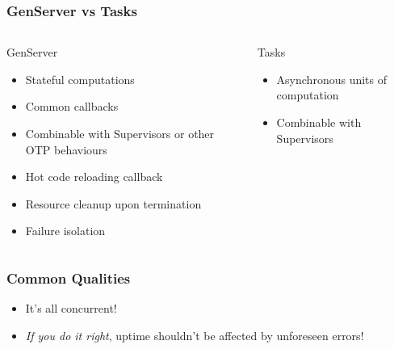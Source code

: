 \begin{frame}
    \frametitle{GenServer vs Tasks}
    \begin{columns}
        \begin{column}[T]{0.5\textwidth}
            GenServer
            \vfill
            \begin{itemize}
                \small
                \item Stateful computations
                \item Common callbacks
                \item Combinable with Supervisors or other OTP behaviours
                \item Hot code reloading callback
                \item Resource cleanup upon termination
                \item Failure isolation
            \end{itemize}
        \end{column}
        \begin{column}[T]{0.5\textwidth}
            Tasks
            \begin{itemize}
                \small
                \item Asynchronous units of computation
                \item Combinable with Supervisors
            \end{itemize}
        \end{column}
    \end{columns}
\end{frame}

\begin{frame}
    \frametitle{Common Qualities}
    \begin{itemize}
        \item It's all concurrent!
        \item \textit{If you do it right}, uptime shouldn't be affected by unforeseen errors!
    \end{itemize}
\end{frame}